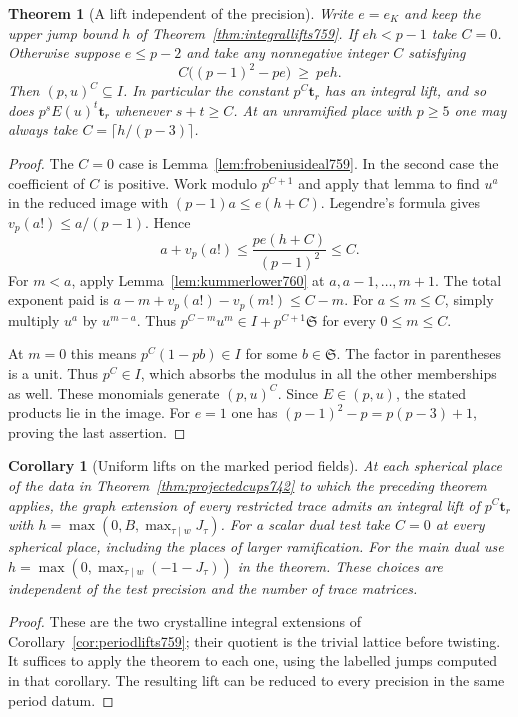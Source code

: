 \documentclass[a4paper,11pt]{article}
\newtheorem{theorem}[proposition]{Theorem}
\newtheorem{corollary}[proposition]{Corollary}
\theoremstyle{definition}
\theoremstyle{remark}
\numberwithin{equation}{section}
\begin{document}
\begin{theorem}[A lift independent of the precision]
\leavevmode\label{thm:uniformlift760}
Write \(e=e_K\) and keep the upper jump bound \(h\) of
Theorem~\ref{thm:integrallifts759}. If \(eh<p-1\) take \(C=0\).
Otherwise suppose \(e\le p-2\) and take any nonnegative
integer \(C\) satisfying
\[
             C\big((p-1)^2-pe\big)\ \ge\ peh.
\]
Then \((p,u)^C\subseteq I\). In particular the constant
\(p^C\mathbf t_r\) has an integral lift, and so does
\(p^s E(u)^t\mathbf t_r\) whenever \(s+t\ge C\).
At an unramified place with \(p\ge5\) one may always take
\(C=\lceil h/(p-3)\rceil\).
\end{theorem}
\begin{proof}
The \(C=0\) case is Lemma~\ref{lem:frobeniusideal759}. In
the second case the coefficient of \(C\) is positive.
Work modulo \(p^{C+1}\) and apply that lemma to find \(u^a\)
in the reduced image with \((p-1)a\le e(h+C)\). Legendre's
formula gives \(v_p(a!)\le a/(p-1)\). Hence
\[
                a+v_p(a!)\le \frac{pe(h+C)}{(p-1)^2}\le C .
\]
For \(m<a\), apply Lemma~\ref{lem:kummerlower760} at
\(a,a-1,\ldots,m+1\). The total exponent paid is
\(a-m+v_p(a!)-v_p(m!)\le C-m\).
For \(a\le m\le C\), simply multiply \(u^a\) by \(u^{m-a}\).
Thus \(p^{C-m}u^m\in I+p^{C+1}\mathfrak S\) for every
\(0\le m\le C\).

At \(m=0\) this means \(p^C(1-pb)\in I\) for some
\(b\in\mathfrak S\). The factor in parentheses is a unit.
Thus \(p^C\in I\), which absorbs the modulus in all the other
memberships as well. These monomials generate \((p,u)^C\).
Since \(E\in(p,u)\), the stated products lie in the image.
For \(e=1\) one has \((p-1)^2-p=p(p-3)+1\), proving the
last assertion.
\end{proof}

\begin{corollary}[Uniform lifts on the marked period fields]
\leavevmode\label{cor:uniformperiodlift760}
At each spherical place of the data in
Theorem~\ref{thm:projectedcups742} to which the preceding
theorem applies, the graph extension of every restricted trace
admits an integral lift of \(p^C\mathbf t_r\) with
\(h=\max(0,B,\max_{\tau\mid w}J_\tau)\). For a scalar dual
test take \(C=0\) at every spherical place, including the
places of larger ramification. For the main dual use
\(h=\max(0,\max_{\tau\mid w}(-1-J_\tau))\) in the theorem.
These choices are independent of the test precision and the
number of trace matrices.
\end{corollary}
\begin{proof}
These are the two crystalline integral extensions of
Corollary~\ref{cor:periodlifts759}; their quotient is the
trivial lattice before twisting. It suffices to apply the
theorem to each one, using the labelled jumps computed in
that corollary. The resulting lift can be reduced to every
precision in the same period datum.
\end{proof}
\clearpage
\end{document}
